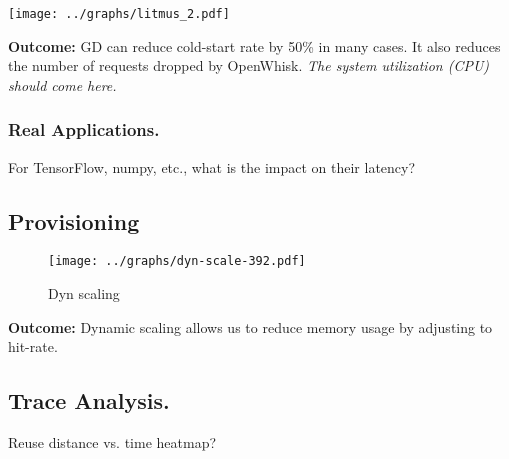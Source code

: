 \texttt{[image: ../graphs/litmus\_2.pdf]}

\textbf{Outcome:} GD can reduce cold-start rate by 50\% in many cases. It also reduces the number of requests dropped by OpenWhisk. \emph{The system utilization (CPU) should come here.}


\subsubsection{Real Applications.}

For TensorFlow, numpy, etc., what is the impact on their latency?

\subsection{Provisioning}

\begin{figure}[t]
  \centering
  \texttt{[image: ../graphs/dyn-scale-392.pdf]}  
  \caption{Dyn scaling}
  \label{fig:dyn-scale}
\end{figure}


\textbf{Outcome:} Dynamic scaling allows us to reduce memory usage by adjusting to hit-rate. 


\subsection{Trace Analysis.}

Reuse distance vs. time heatmap? 